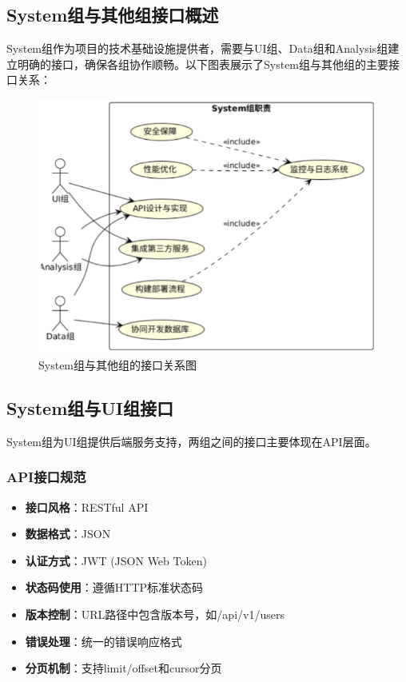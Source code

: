 \documentclass[a4paper,12pt]{article}
\begin{document}
\subsection{System组与其他组接口概述}

System组作为项目的技术基础设施提供者，需要与UI组、Data组和Analysis组建立明确的接口，确保各组协作顺畅。以下图表展示了System组与其他组的主要接口关系：

\begin{figure}[H]
    \centering
    \includegraphics[width=0.8\linewidth]{assets/image2.png}
    \caption{System组与其他组的接口关系图}
    \label{fig:interface-relations}
\end{figure}

\subsection{System组与UI组接口}

System组为UI组提供后端服务支持，两组之间的接口主要体现在API层面。

\subsubsection{API接口规范}

\begin{itemize}
  \item \textbf{接口风格}：RESTful API
  \item \textbf{数据格式}：JSON
  \item \textbf{认证方式}：JWT (JSON Web Token)
  \item \textbf{状态码使用}：遵循HTTP标准状态码
  \item \textbf{版本控制}：URL路径中包含版本号，如/api/v1/users
  \item \textbf{错误处理}：统一的错误响应格式
  \item \textbf{分页机制}：支持limit/offset和cursor分页
\end{itemize}
\end{document}
